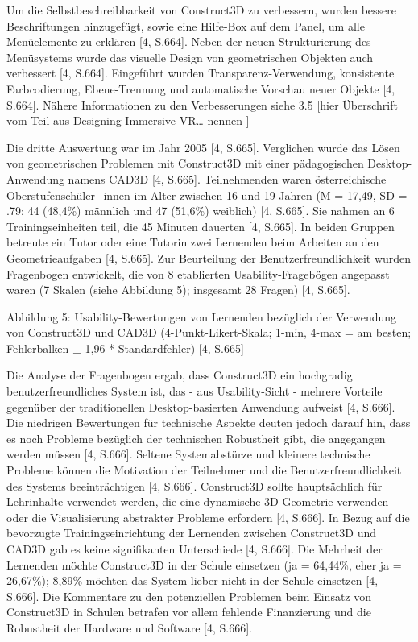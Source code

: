 \documentclass[deutsch]{llncs}
\begin{document}
Um die Selbstbeschreibbarkeit von Construct3D zu verbessern, wurden bessere Beschriftungen hinzugefügt, sowie eine Hilfe-Box auf dem Panel, um alle Menüelemente zu erklären [4, S.664]. Neben der neuen Strukturierung des Menüsystems wurde das visuelle Design von geometrischen Objekten auch verbessert [4, S.664]. Eingeführt wurden Transparenz-Verwendung, konsistente Farbcodierung, Ebene-Trennung und automatische Vorschau neuer Objekte [4, S.664]. Nähere Informationen zu den Verbesserungen siehe 3.5 [hier Überschrift vom Teil aus Designing Immersive VR… nennen ]

Die dritte Auswertung war im Jahr 2005 [4, S.665]. Verglichen wurde das Lösen von geometrischen Problemen mit Construct3D mit einer pädagogischen Desktop-Anwendung namens CAD3D [4, S.665]. Teilnehmenden waren österreichische Oberstufenschüler\_innen im Alter zwischen 16 und 19 Jahren (M = 17,49, SD = .79; 44 (48,4\%) männlich und 47 (51,6\%) weiblich) [4, S.665]. Sie nahmen an 6 Trainingseinheiten teil, die 45 Minuten dauerten [4, S.665]. In beiden Gruppen betreute ein Tutor oder eine Tutorin zwei Lernenden beim Arbeiten an den Geometrieaufgaben [4, S.665]. Zur Beurteilung der Benutzerfreundlichkeit wurden Fragenbogen entwickelt, die von 8 etablierten Usability-Fragebögen angepasst waren (7 Skalen (siehe Abbildung 5); insgesamt 28 Fragen) [4, S.665].

Abbildung 5: Usability-Bewertungen von Lernenden bezüglich der Verwendung von Construct3D und CAD3D (4-Punkt-Likert-Skala; 1-min, 4-max = am besten; Fehlerbalken $\pm$ 1,96 * Standardfehler) [4, S.665]

Die Analyse der Fragenbogen ergab, dass Construct3D ein hochgradig benutzerfreundliches System ist, das - aus Usability-Sicht - mehrere Vorteile gegenüber der traditionellen Desktop-basierten Anwendung aufweist [4, S.666]. Die niedrigen Bewertungen für technische Aspekte deuten jedoch darauf hin, dass es noch Probleme bezüglich der technischen Robustheit gibt, die angegangen werden müssen [4, S.666]. Seltene Systemabstürze und kleinere technische Probleme können die Motivation der Teilnehmer und die Benutzerfreundlichkeit des Systems beeinträchtigen [4, S.666]. Construct3D sollte hauptsächlich für Lehrinhalte verwendet werden, die eine dynamische 3D-Geometrie verwenden oder die Visualisierung abstrakter Probleme erfordern [4, S.666]. In Bezug auf die bevorzugte Trainingseinrichtung der Lernenden zwischen Construct3D und CAD3D gab es keine signifikanten Unterschiede [4, S.666]. Die Mehrheit der Lernenden möchte Construct3D in der Schule einsetzen (ja = 64,44\%, eher ja = 26,67\%); 8,89\% möchten das System lieber nicht in der Schule einsetzen [4, S.666].  Die Kommentare zu den potenziellen Problemen beim Einsatz von Construct3D in Schulen betrafen vor allem fehlende Finanzierung und die Robustheit der Hardware und Software [4, S.666].
\end{document}
